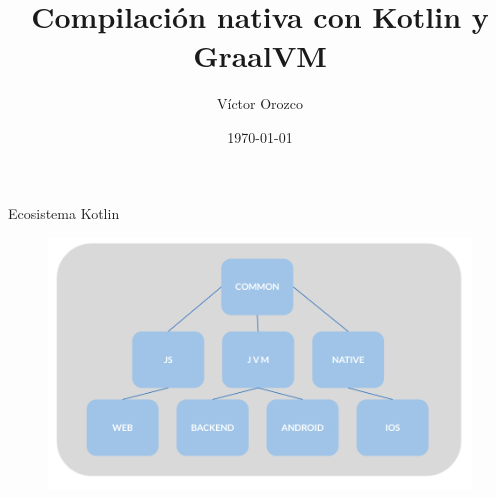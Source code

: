 \documentclass[aspectratio=169]{beamer}
\title{Compilación nativa con Kotlin y GraalVM}
\author{Víctor Orozco}
\institute{Nabenik}
\date{\today}
\begin{document}
{
    \frame{\titlepage}
}


\begin{frame}{Ecosistema Kotlin}
\begin{figure}
	\centering
	\includegraphics[width=0.8\linewidth]{Images/KotlinNative.png}
	\label{fig:kotlin}
\end{figure}
\end{frame}
\end{document}
